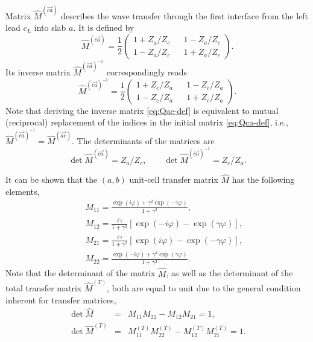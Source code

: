 \documentclass[aps,pra,reprint,showpacs,bibnotes,preprintnumbers,twoside,eqsecnum]{revtex4-1}
\begin{document}
Matrix $\hat{M}^{(\overrightarrow{ca})}$ describes the wave transfer through the first interface from the left lead $c_L$ into slab $a$. It is defined by
%
\begin{equation}\label{eq:Qca-def}
\hat{M}^{(\overrightarrow{ca})}=\frac{1}{2}
\left(\begin{array}{ccc}1+Z_a/Z_c&&1-Z_a/Z_c\\[6pt]
1-Z_a/Z_c&&1+Z_a/Z_c\end{array}\right).
\end{equation}
Its inverse matrix $\hat{M}^{(\overrightarrow{ca})^{-1}}$ correspondingly reads
%
\begin{equation}\label{eq:Qac-def}
\hat{M}^{(\overrightarrow{ca})^{-1}}=\frac{1}{2}
\left(\begin{array}{ccc}1+Z_c/Z_a&&1-Z_c/Z_a\\[6pt]
1-Z_c/Z_a&&1+Z_c/Z_a\end{array}\right).
\end{equation}
Note that deriving the inverse matrix \eqref{eq:Qac-def} is equivalent to mutual (reciprocal) replacement of the indices in the initial matrix \eqref{eq:Qca-def}, i.e., $\hat{M}^{(\overrightarrow{ca})^{-1}}=\hat{M}^{(\overrightarrow{ac})}$. The determinants of the matrices are
%
\begin{equation}\label{eq:DetQcaac}
\det\hat{M}^{(\overrightarrow{ca})}=Z_a/Z_c,\qquad\det\hat{M}^{(\overrightarrow{ca})^{-1}}=Z_c/Z_a.
\end{equation}

It can be shown \cite{RIMC16} that the $(a,b)$ unit-cell transfer matrix $\hat{M}$ has the following elements,
%
\begin{eqnarray}\label{eq:BLMMDLG-M}
&&M_{11}=\frac{\exp(i\varphi)+\gamma^2\exp(-\gamma\varphi)}{1+\gamma^2},\nonumber\\
&&M_{12}=\frac{i\gamma}{1+\gamma^2}\left[\exp(-i\varphi)-\exp(\gamma\varphi)\right],\nonumber\\
&&M_{21}=\frac{i\gamma}{1+\gamma^2}\left[\exp(i\varphi)-\exp(-\gamma\varphi)\right],\nonumber\\
&&M_{22}=\frac{\exp(-i\varphi)+\gamma^2\exp(\gamma\varphi)}{1+\gamma^2}.
\end{eqnarray}
Note that the determinant of the matrix $\hat{M}$, as well as the determinant of the total transfer matrix $\hat{M}^{(T)}$, both are equal to unit due to the general condition inherent for transfer matrices,
%
\begin{subequations}\label{eq:DetMMT}
\begin{eqnarray}
\det\hat{M}&=&M_{11}M_{22}-M_{12}M_{21}=1,\\
\det\hat{M}^{(T)}&=&M_{11}^{(T)}M_{22}^{(T)}-M_{12}^{(T)}M_{21}^{(T)}=1.
\end{eqnarray}
\end{subequations}
\end{document}
